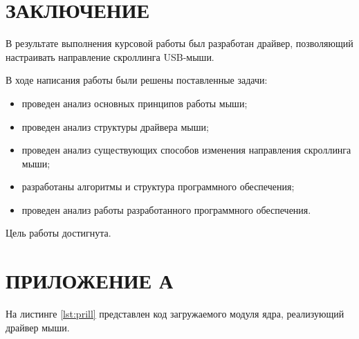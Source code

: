 \documentclass{bmstu}
\begin{document}
\clearpage


\chapter*{ЗАКЛЮЧЕНИЕ}

В результате выполнения курсовой работы был разработан драйвер, позволяющий 
настраивать направление скроллинга USB-мыши.

В ходе написания работы были решены поставленные задачи:

\begin{itemize}
	\item проведен анализ основных принципов работы мыши;
	\item проведен анализ структуры драйвера мыши;
	\item проведен анализ существующих способов изменения направления скроллинга мыши;
	\item разработаны алгоритмы и структура программного обеспечения;
	\item проведен анализ работы разработанного программного обеспечения.
\end{itemize}

Цель работы достигнута.


\clearpage
\makebibliography

\chapter*{ПРИЛОЖЕНИЕ А}

На листинге \ref{lst:prill} представлен код загружаемого модуля ядра, реализующий
драйвер мыши.
\end{document}
